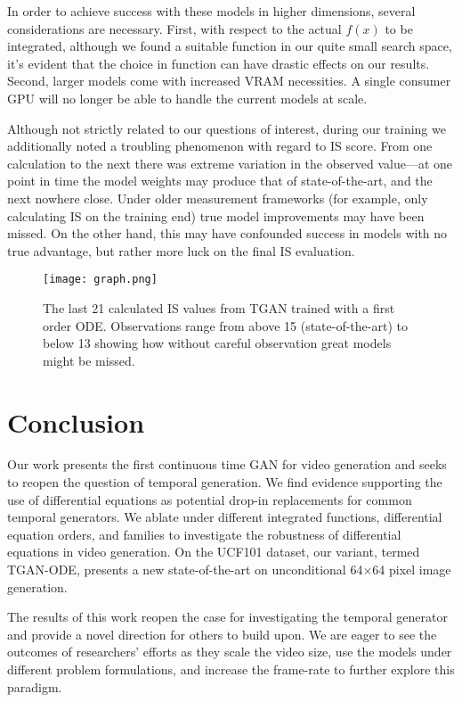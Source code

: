 \documentclass[tablecaption=bottom,pmlr]{jmlr}
\begin{document}
In order to achieve success with these models in higher dimensions, several considerations are necessary. First, with respect to the actual $f(x)$ to be integrated, although we found a suitable function in our quite small search space, it's evident that the choice in function can have drastic effects on our results. Second, larger models come with increased VRAM necessities. A single consumer GPU will no longer be able to handle the current models at scale.

Although not strictly related to our questions of interest, during our training we additionally noted a troubling phenomenon with regard to IS score. From one calculation to the next there was extreme variation in the observed value---at one point in time the model weights may produce that of state-of-the-art, and the next nowhere close. Under older measurement frameworks (for example, only calculating IS on the training end) true model improvements may have been missed. On the other hand, this may have confounded success in models with no true advantage, but rather more luck on the final IS evaluation. 


\begin{figure}
    \centering
    \texttt{[image: graph.png]}
    \caption{The last 21 calculated IS values from TGAN trained with a first order ODE. Observations range from above 15 (state-of-the-art) to below 13 showing how without careful observation great models might be missed.}
    \label{fig:is_values}
\end{figure}

\section{Conclusion}

Our work presents the first continuous time GAN for video generation and seeks to reopen the question of temporal generation. We find evidence supporting the use of differential equations as potential drop-in replacements for common temporal generators.  We ablate under different integrated functions, differential equation orders, and families to investigate the robustness of differential equations in video generation. On the UCF101 dataset, our variant, termed TGAN-ODE, presents a new state-of-the-art on unconditional 64$\times$64 pixel image generation.

The results of this work reopen the case for investigating the temporal generator and provide a novel direction for others to build upon. We are eager to see the outcomes of researchers' efforts as they scale the video size, use the models under different problem formulations, and increase the frame-rate to further explore this paradigm.


\end{document}
